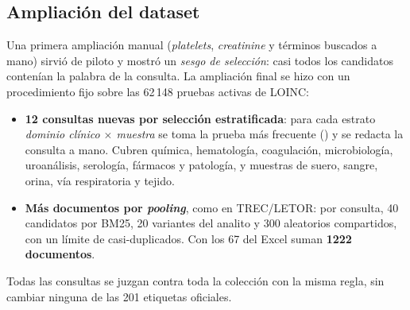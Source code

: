 \documentclass[11pt,a4paper]{article}
\begin{document}
\subsection{Ampliación del dataset}
Una primera ampliación manual (\emph{platelets}, \emph{creatinine} y términos buscados a mano) sirvió de piloto y mostró un
\emph{sesgo de selección}: casi todos los candidatos contenían la palabra de la consulta. La ampliación final se hizo con un
procedimiento fijo sobre las 62\,148 pruebas activas de LOINC:
\begin{itemize}[nosep]
\item \textbf{12 consultas nuevas por selección estratificada}: para cada estrato \emph{dominio clínico $\times$ muestra} se toma la
  prueba más frecuente () y se redacta la consulta a mano. Cubren química, hematología, coagulación,
  microbiología, uroanálisis, serología, fármacos y patología, y muestras de suero, sangre, orina, vía respiratoria y tejido.
\item \textbf{Más documentos por \emph{pooling}}, como en TREC/LETOR: por consulta, 40 candidatos por BM25, 20 variantes del
  analito y 300 aleatorios compartidos, con un límite de casi-duplicados. Con los 67 del Excel suman \textbf{1222 documentos}.
\end{itemize}
Todas las consultas se juzgan contra toda la colección con la misma regla, sin cambiar ninguna de las 201 etiquetas oficiales.

\begin{table}[h]
\centering\footnotesize

\caption{Distribución de etiquetas. $^\dagger$: consultas de la ampliación.}
\end{table}
\end{document}
